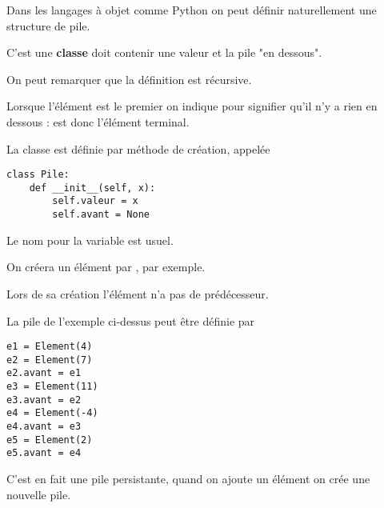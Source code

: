 \begin{center}
\end{center}
Dans les langages à objet comme Python on peut définir naturellement une structure de pile. 

C'est une {\bf classe} doit contenir une valeur et la pile "en dessous".

On peut remarquer que la définition est récursive.

Lorsque l'élément est le premier on indique  pour signifier qu'il n'y a rien en dessous :  est donc l'élément terminal.

La classe est définie par méthode de création, appelée 
\begin{lstlisting}
class Pile:
    def __init__(self, x):
        self.valeur = x
        self.avant = None
\end{lstlisting}
Le nom  pour la variable est usuel.

On créera un élément par , par exemple. 

Lors de sa création l'élément n'a pas de prédécesseur.

La pile de l'exemple ci-dessus peut être définie par 
\begin{lstlisting}
e1 = Element(4)
e2 = Element(7)
e2.avant = e1
e3 = Element(11)
e3.avant = e2
e4 = Element(-4)
e4.avant = e3
e5 = Element(2)
e5.avant = e4
\end{lstlisting}
C'est en fait une pile persistante, quand on ajoute un élément on crée une nouvelle pile.

